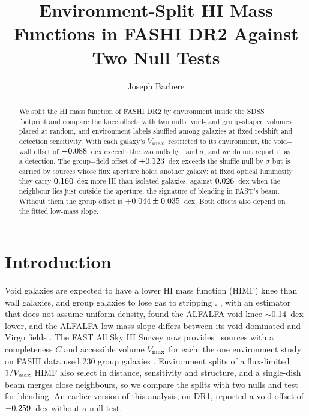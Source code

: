 \documentclass[twocolumn]{aastex631}
\begin{document}
\title{Environment-Split HI Mass Functions in FASHI DR2 Against Two Null Tests}
\author[0009-0008-3289-4447]{Joseph Barbere}

\begin{abstract}
We split the HI mass function of FASHI DR2 by environment inside the SDSS footprint and compare
the knee offsets with two nulls: void- and group-shaped volumes placed at random, and environment
labels shuffled among galaxies at fixed redshift and detection sensitivity. With each galaxy's
$V_{\rm max}$ restricted to its environment, the void$-$wall offset of $-0.088$~dex
exceeds the two nulls by \feRealEnvVoidQuadSigma\ and \feRealShufVoidEnvSigma$\sigma$, and we do not
report it as a detection. The group$-$field offset of $+0.123$~dex exceeds the
shuffle null by \feRealShufGroupEnvSigma$\sigma$ but is carried by sources whose flux aperture holds
another galaxy: at fixed optical luminosity they carry $0.160$~dex more HI
than isolated galaxies, against $0.026$~dex when the neighbour lies just
outside the aperture, the signature of blending in FAST's beam. Without them the group offset is
$+0.044\pm0.035$~dex. Both offsets also depend
on the fitted low-mass slope.
\end{abstract}


\section{Introduction}
Void galaxies are expected to have a lower HI mass function (HIMF) knee than wall galaxies, and
group galaxies to lose gas to stripping \citep{solanes2001}. \citet{moorman2014}, with an estimator
that does not assume uniform density, found the ALFALFA void knee $\sim$0.14~dex lower, and the
ALFALFA low-mass slope differs between its void-dominated and Virgo fields \citep{jones2018}. The
FAST All Sky HI Survey \citep[FASHI;][]{fashi_dr1,fashi_dr2} now provides \feRealNDRTwo\ sources
with a completeness $C$ and accessible volume $V_{\rm max}$ for each; the one environment study on
FASHI data used 230 group galaxies \citep{fashi_groups}. Environment splits of a flux-limited
$1/V_{\rm max}$ HIMF also select in distance, sensitivity and structure, and a single-dish beam
merges close neighbours, so we compare the splits with two nulls and test for blending. An
earlier version of this analysis, on DR1, reported a void offset of
$-0.259$~dex without a null test.
\end{document}
